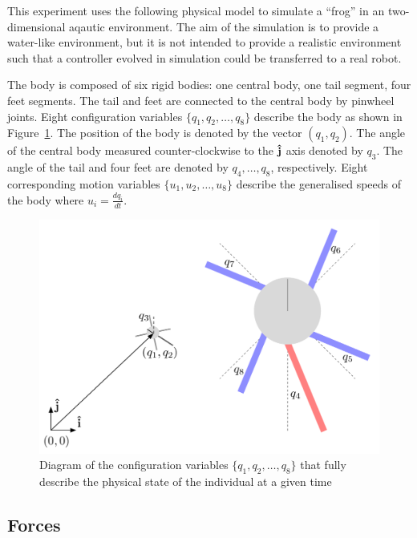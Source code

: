 This experiment uses the following physical model to simulate a
``frog'' in an two-dimensional aqautic environment.  The aim of the
simulation is to provide a water-like environment, but it is not
intended to provide a realistic environment such that a controller
evolved in simulation could be transferred to a real
robot.  

The body is composed of six rigid bodies: one central body, one tail
segment, four feet segments.  The tail and feet are connected to the
central body by pinwheel joints.  Eight configuration variables
$\{q_1, q_2, \ldots, q_8\}$ describe the body as shown in
Figure~\ref{confvars}.  The position of the body is denoted by the
vector $(q_1, q_2)$.  The angle of the central body measured counter-clockwise
to the $\bf \hat j$ axis denoted by $q_3$.  The angle of the tail and
four feet are denoted by $q_4, \ldots, q_8$, respectively.  Eight
corresponding motion variables $\{u_1, u_2, \ldots, u_8\}$ describe
the generalised speeds of the body where $u_i = \frac{d q_i}{d t}$.

\begin{figure}  
  \centering
  \includegraphics[scale=0.6]{fig/confvars.pdf} 
  \caption[Diagram of configuration variables]{\label{confvars}Diagram
    of the configuration variables $\{q_1, q_2, \ldots, q_8\}$ that
    fully describe the physical state of the individual at a given
    time}
\end{figure}

\subsection{Forces}

